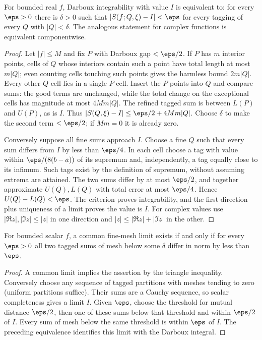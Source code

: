 \begin{theorem}
For bounded real $f$, Darboux integrability with value $I$ is equivalent to:
for every $\eps>0$ there is $\delta>0$ such that
$|S(f;Q,\xi)-I|<\eps$ for every tagging of every $Q$ with $|Q|<\delta$.
The analogous statement for complex functions is equivalent componentwise.
\end{theorem}
\begin{proof}
Let $|f|\le M$ and fix $P$ with Darboux gap $<\eps/2$.
If $P$ has $m$ interior points, cells of $Q$ whose interiors contain
such a point have total length at most $m|Q|$; even counting cells
touching such points gives the harmless bound $2m|Q|$.
Every other $Q$ cell lies in a single $P$ cell. Insert the $P$ points
into $Q$ and compare sums: the good terms are unchanged, while the total
change on the exceptional cells has magnitude at most $4Mm|Q|$.
The refined tagged sum is between $L(P)$ and $U(P)$, as is $I$.
Thus $|S(Q,\xi)-I|\le\eps/2+4Mm|Q|$. Choose $\delta$ to make the
second term $<\eps/2$; if $M m=0$ it is already zero.

Conversely suppose all fine sums approach $I$. Choose a fine $Q$ such that
every sum differs from $I$ by less than $\eps/4$. In each cell choose a
tag with value within $\eps/(8(b-a))$ of its supremum and, independently,
a tag equally close to its infimum. Such tags exist by the definition of
supremum, without assuming extrema are attained. The two sums differ by
at most $\eps/2$, and together approximate $U(Q),L(Q)$ with total error
at most $\eps/4$. Hence $U(Q)-L(Q)<\eps$. The criterion proves
integrability, and the first direction plus uniqueness of a limit proves
the value is $I$. For complex values use $|\Re z|,|\Im z|\le|z|$ in one
direction and $|z|\le|\Re z|+|\Im z|$ in the other.
\end{proof}

\begin{theorem}
For bounded scalar $f$, a common fine-mesh limit exists if and only if
for every $\eps>0$ all two tagged sums of mesh below some $\delta$
differ in norm by less than $\eps$.
\end{theorem}
\begin{proof}
A common limit implies the assertion by the triangle inequality.
Conversely choose any sequence of tagged partitions with meshes tending
to zero (uniform partitions suffice). Their sums are a Cauchy sequence,
so scalar completeness gives a limit $I$. Given $\eps$, choose the
threshold for mutual distance $\eps/2$, then one of these sums below that
threshold and within $\eps/2$ of $I$. Every sum of mesh below the same
threshold is within $\eps$ of $I$. The preceding equivalence identifies
this limit with the Darboux integral.
\end{proof}

